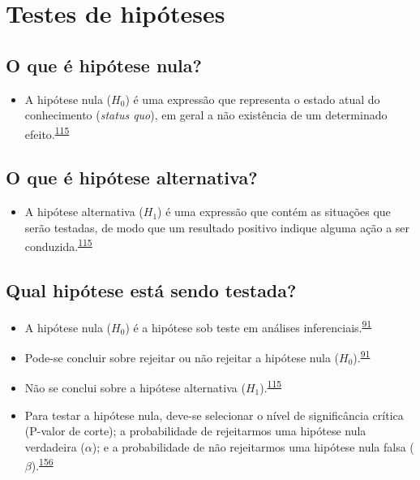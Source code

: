 \documentclass[
  a4paper,
]{book}
\providecommand{\tightlist}{%
  \setlength{\itemsep}{0pt}\setlength{\parskip}{0pt}}
\begin{document}
\hypertarget{erros-inferencia}{%
\section{Testes de hipóteses}\label{erros-inferencia}}

\hypertarget{o-que-uxe9-hipuxf3tese-nula}{%
\subsection{O que é hipótese nula?}\label{o-que-uxe9-hipuxf3tese-nula}}

\begin{itemize}
\tightlist
\item
  A hipótese nula (\(H_{0}\)) é uma expressão que representa o estado atual do conhecimento (\emph{status quo}), em geral a não existência de um determinado efeito.\textsuperscript{\protect\hyperlink{ref-kanji2006}{115}}
\end{itemize}

\hypertarget{o-que-uxe9-hipuxf3tese-alternativa}{%
\subsection{O que é hipótese alternativa?}\label{o-que-uxe9-hipuxf3tese-alternativa}}

\begin{itemize}
\tightlist
\item
  A hipótese alternativa (\(H_{1}\)) é uma expressão que contém as situações que serão testadas, de modo que um resultado positivo indique alguma ação a ser conduzida.\textsuperscript{\protect\hyperlink{ref-kanji2006}{115}}
\end{itemize}

\hypertarget{qual-hipuxf3tese-estuxe1-sendo-testada}{%
\subsection{Qual hipótese está sendo testada?}\label{qual-hipuxf3tese-estuxe1-sendo-testada}}

\begin{itemize}
\item
  A hipótese nula (\(H_{0}\)) é a hipótese sob teste em análises inferenciais.\textsuperscript{\protect\hyperlink{ref-Ali2016}{91}}
\item
  Pode-se concluir sobre rejeitar ou não rejeitar a hipótese nula (\(H_{0}\)).\textsuperscript{\protect\hyperlink{ref-Ali2016}{91}}
\item
  Não se conclui sobre a hipótese alternativa (\(H_{1}\)).\textsuperscript{\protect\hyperlink{ref-kanji2006}{115}}
\item
  Para testar a hipótese nula, deve-se selecionar o nível de significância crítica (P-valor de corte); a probabilidade de rejeitarmos uma hipótese nula verdadeira (\(\alpha\)); e a probabilidade de não rejeitarmos uma hipótese nula falsa (\(\beta\)).\textsuperscript{\protect\hyperlink{ref-Curran-Everett2009}{156}}
\end{itemize}
\end{document}
